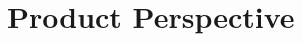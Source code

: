 \documentclass[../../rasd.tex]{subfiles}
\begin{document}
	
	\section{Product Perspective}

		
\end{document}
